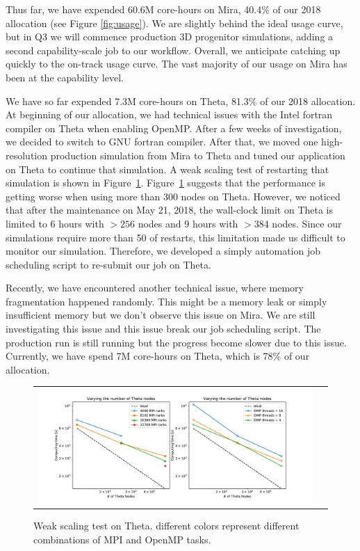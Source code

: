 \documentclass[12pt,titlepage]{article}
\begin{document}
Thus far, we have expended 60.6M core-hours on Mira, 40.4\% of our 2018 allocation (see Figure \ref{fig:usage}).
We are slightly behind the ideal usage curve, but in Q3 we will commence production 3D progenitor simulations, adding a second capability-scale job to our workflow.
Overall, we anticipate catching up quickly to the on-track usage curve.
The vast majority of our usage on Mira has been at the capability level.


We have so far expended 7.3M core-hours on Theta, 81.3\% of our 2018 allocation. 
At beginning of our allocation, we had technical issues with the Intel fortran compiler on Theta when enabling OpenMP.
After a few weeks of investigation, we decided to switch to GNU fortran compiler.    
After that, we moved one high-resolution production simulation from Mira to Theta 
and tuned our application on Theta to continue that simulation. 
A weak scaling test of restarting that simulation is shown in Figure~\ref{fig:theta}.
Figure~\ref{fig:theta} suggests that the performance is getting worse when using more than 300 nodes on Theta.
However, we noticed that after the maintenance on May 21, 2018, the wall-clock limit on Theta is limited to 6 hours 
with $> 256$ nodes and 9 hours with $> 384$ nodes.
Since our simulations require more than 50 of restarts, this limitation made us difficult to monitor our simulation.
Therefore, we developed a simply automation job scheduling script to re-submit our job on Theta.    
 
Recently, we have encountered another technical issue, where memory fragmentation happened randomly. 
This might be a memory leak or simply insufficient memory but we don't observe this issue on Mira. 
We are still investigating this issue and this issue break our job scheduling script.
The production run is still running but the progress become slower due to this issue.    
Currently, we have spend 7M core-hours on Theta, which is 78\% of our allocation. 

\begin{figure}
  \begin{tabular}{cc} 
    \includegraphics[width=6.5in]{./theta/fig_theta_scaling_j4.pdf}
  \end{tabular}
  \caption{Weak scaling test on Theta. different colors represent different combinations of MPI and OpenMP tasks. }
  \label{fig:theta}
\end{figure}
\end{document}
